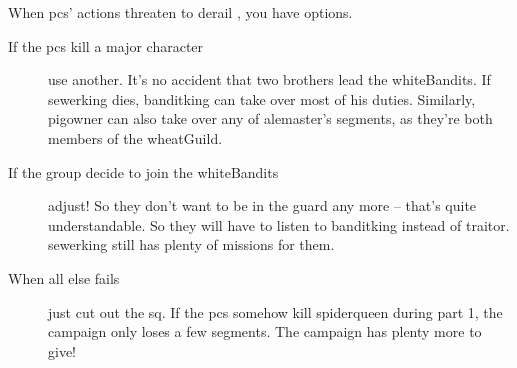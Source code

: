 \begin{multicols}{2}
When \glspl{pc}' actions threaten to derail , you have options.

\begin{description}
  \item[If the \glspl{pc} kill a major character]
  use another.
  It's no accident that two brothers lead the \gls{whiteBandits}.
  If \gls{sewerking} dies, \gls{banditking} can take over most of his duties.
  Similarly, \gls{pigowner} can also take over any of \gls{alemaster}'s \glspl{segment}, as they're both members of the \gls{wheatGuild}.
  \item[If the group decide to join the \gls{whiteBandits}]
  adjust!
  So they don't want to be in the \gls{guard} any more -- that's quite understandable.
  So they will have to listen to \gls{banditking} instead of \gls{traitor}.
  \Gls{sewerking} still has plenty of missions for them.
  \item[When all else fails]
  just cut out the \gls{sq}.
  If the \glspl{pc} somehow kill \gls{spiderqueen} during part 1, the campaign only loses a few \glspl{segment}.
  The campaign has plenty more to give!
\end{description}

\end{multicols}


\printglossary[
  type=people,
  style=topicmcols,
]

